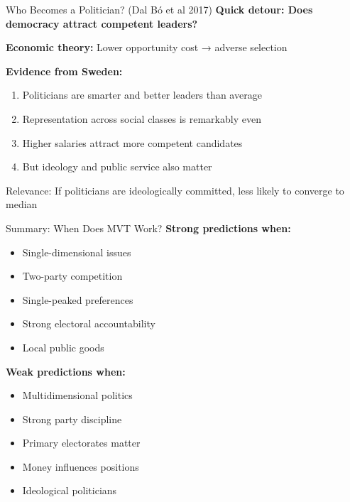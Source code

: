\documentclass[10pt]{beamer}
\begin{document}
\begin{frame}{Who Becomes a Politician? (Dal Bó et al 2017)}
\textbf{Quick detour: Does democracy attract competent leaders?}



\textbf{Economic theory:} Lower opportunity cost → adverse selection



\textbf{Evidence from Sweden:}
\begin{enumerate}
\item Politicians are \alert{smarter and better leaders} than average
\item Representation across social classes is \alert{remarkably even}
\item Higher salaries attract more competent candidates
\item But ideology and public service also matter
\end{enumerate}



\alert{Relevance:} If politicians are ideologically committed, less likely to converge to median


\small{\hyperlink{dal-bo}{}}
\end{frame}

\begin{frame}{Summary: When Does MVT Work?}
\textbf{Strong predictions when:}
\begin{itemize}
\item Single-dimensional issues
\item Two-party competition
\item Single-peaked preferences
\item Strong electoral accountability
\item Local public goods
\end{itemize}



\textbf{Weak predictions when:}
\begin{itemize}
\item Multidimensional politics
\item Strong party discipline
\item Primary electorates matter
\item Money influences positions
\item Ideological politicians
\end{itemize}
\end{frame}
\end{document}
